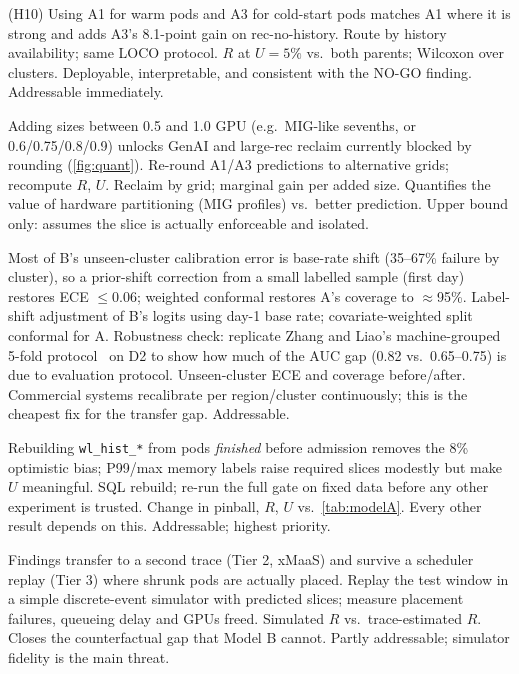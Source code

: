 {(H10) Using A1 for warm pods and A3 for cold-start pods matches A1 where it is strong and adds A3's 8.1-point gain on rec-no-history.}
{Route by history availability; same LOCO protocol.}
{$R$ at $U=5\%$ vs.\ both parents; Wilcoxon over clusters.}
{Deployable, interpretable, and consistent with the NO-GO finding.}
{Addressable immediately.}

{Adding sizes between 0.5 and 1.0 GPU (e.g.\ MIG-like sevenths, or 0.6/0.75/0.8/0.9) unlocks GenAI and large-rec reclaim currently blocked by rounding (\cref{fig:quant}).}
{Re-round A1/A3 predictions to alternative grids; recompute $R$, $U$.}
{Reclaim by grid; marginal gain per added size.}
{Quantifies the value of hardware partitioning (MIG profiles) vs.\ better prediction.}
{Upper bound only: assumes the slice is actually enforceable and isolated.}

{Most of B's unseen-cluster calibration error is base-rate shift (35--67\% failure by cluster), so a prior-shift correction from a small labelled sample (first day) restores ECE $\le$0.06; weighted conformal restores A's coverage to $\approx$95\%.}
{Label-shift adjustment of B's logits using day-1 base rate; covariate-weighted split conformal for A. Robustness check: replicate Zhang and Liao's machine-grouped 5-fold protocol~\cite{zhang2026ineffective} on D2 to show how much of the AUC gap (0.82 vs.\ 0.65--0.75) is due to evaluation protocol.}
{Unseen-cluster ECE and coverage before/after.}
{Commercial systems recalibrate per region/cluster continuously; this is the cheapest fix for the transfer gap.}
{Addressable.}

{Rebuilding \texttt{wl\_hist\_*} from pods \emph{finished} before admission removes the 8\% optimistic bias; P99/max memory labels raise required slices modestly but make $U$ meaningful.}
{SQL rebuild; re-run the full gate on fixed data before any other experiment is trusted.}
{Change in pinball, $R$, $U$ vs.\ \cref{tab:modelA}.}
{Every other result depends on this.}
{Addressable; highest priority.}

{Findings transfer to a second trace (Tier 2, xMaaS) and survive a scheduler replay (Tier 3) where shrunk pods are actually placed.}
{Replay the test window in a simple discrete-event simulator with predicted slices; measure placement failures, queueing delay and GPUs freed.}
{Simulated $R$ vs.\ trace-estimated $R$.}
{Closes the counterfactual gap that Model B cannot.}
{Partly addressable; simulator fidelity is the main threat.}

